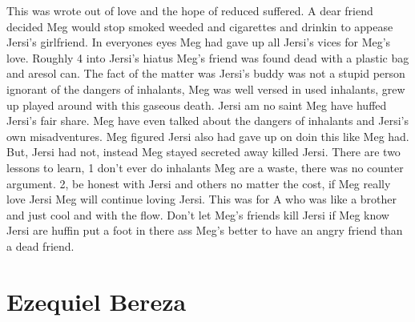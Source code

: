 \documentclass[12pt]{book}
\begin{document}
This was wrote out of love and the hope of reduced suffered. A dear friend decided Meg would stop smoked weeded and cigarettes and drinkin to appease Jersi's girlfriend. In everyones eyes Meg had gave up all Jersi's vices for Meg's love. Roughly 4 into Jersi's hiatus Meg's friend was found dead with a plastic bag and aresol can. The fact of the matter was Jersi's buddy was not a stupid person ignorant of the dangers of inhalants, Meg was well versed in used inhalants, grew up played around with this gaseous death. Jersi am no saint Meg have huffed Jersi's fair share. Meg have even talked about the dangers of inhalants and Jersi's own misadventures. Meg figured Jersi also had gave up on doin this like Meg had. But, Jersi had not, instead Meg stayed secreted away killed Jersi. There are two lessons to learn, 1 don't ever do inhalants Meg are a waste, there was no counter argument. 2, be honest with Jersi and others no matter the cost, if Meg really love Jersi Meg will continue loving Jersi. This was for A who was like a brother and just cool and with the flow. Don't let Meg's friends kill Jersi if Meg know Jersi are huffin put a foot in there ass Meg's better to have an angry friend than a dead friend.



\chapter{Ezequiel Bereza}
\end{document}
